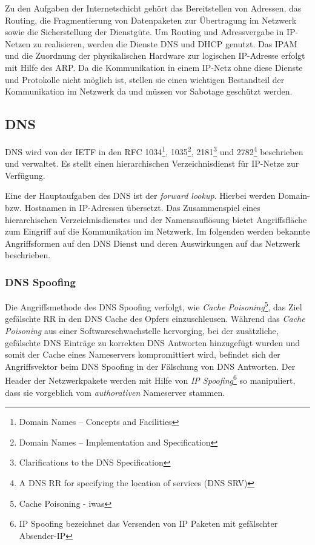 Zu den Aufgaben der Internetschicht gehört das Bereitstellen von Adressen, das Routing, die Fragmentierung von Datenpaketen zur Übertragung im Netzwerk sowie die Sicherstellung der Dienstgüte. Um Routing und Adressvergabe in \ac{IP}-Netzen zu realisieren, werden die Dienste \ac{DNS} und \ac{DHCP} genutzt. Das \ac{IPAM} und die Zuordnung der physikalischen Hardware zur logischen \ac{IP}-Adresse erfolgt mit Hilfe des \ac{ARP}. Da die Kommunikation in einem \ac{IP}-Netz ohne diese Dienste und Protokolle nicht möglich ist, stellen sie einen wichtigen Bestandteil der Kommunikation im Netzwerk da und müssen vor Sabotage geschützt werden.

\subsection{\ac{DNS}}
\ac{DNS} wird von der \ac{IETF} in den \ac{RFC} 1034\footnote{Domain Names – Concepts and Facilities}, 1035\footnote{Domain Names – Implementation and Specification}, 2181\footnote{Clarifications to the DNS Specification} und 2782\footnote{A DNS RR for specifying the location of services (DNS SRV)} beschrieben und verwaltet. Es stellt einen hierarchischen Verzeichnisdienst für \ac{IP}-Netze zur Verfügung. 

Eine der Hauptaufgaben des \ac{DNS} ist der \textit{forward lookup}. Hierbei werden Domain- bzw. Hostnamen in \ac{IP}-Adressen übersetzt. Das Zusammenspiel eines hierarchischen Verzeichnisdienstes und der Namensauflösung bietet Angriffsfläche zum Eingriff auf die Kommunikation im Netzwerk. Im folgenden werden bekannte Angriffsformen auf den \ac{DNS} Dienst und deren Auswirkungen auf das Netzwerk beschrieben.

\subsubsection{\ac{DNS} Spoofing}
Die Angriffsmethode des \ac{DNS} Spoofing verfolgt, wie \textit{Cache Poisoning}\footnote{Cache Poisoning - iwas}, das Ziel gefälschte \ac{RR} in den \ac{DNS} Cache des Opfers einzuschleusen. Während das \textit{Cache Poisoning} aus einer Softwareschwachstelle hervorging, bei der zusätzliche, gefälschte \ac{DNS} Einträge zu korrekten \ac{DNS} Antworten hinzugefügt wurden und somit der Cache eines Nameservers kompromittiert wird, befindet sich der Angriffsvektor beim \ac{DNS} Spoofing in der Fälschung von \ac{DNS} Antworten. Der Header der Netzwerkpakete werden mit Hilfe von \textit{IP Spoofing}\footnote{IP Spoofing bezeichnet das Versenden von IP Paketen mit gefälschter Absender-IP} so manipuliert, dass sie vorgeblich vom \textit{authorativen} Nameserver stammen. 

